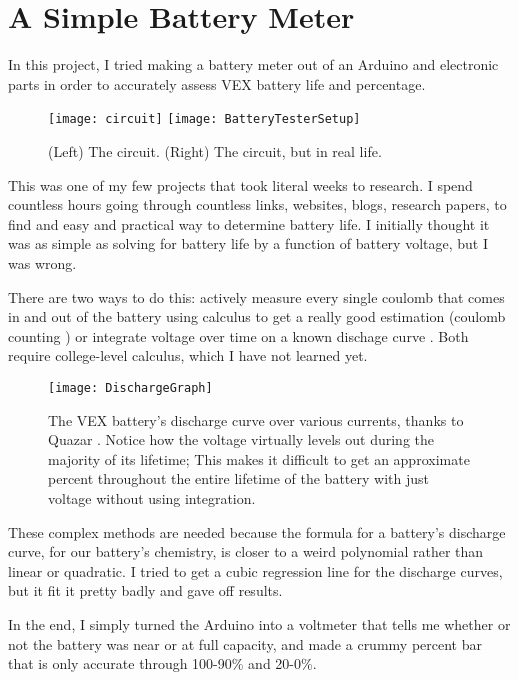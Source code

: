 \section{A Simple Battery Meter}
In this project, I tried making a battery meter out of an Arduino and electronic parts in order to accurately assess VEX battery life and percentage.

\begin{figure}[h]
    \centering
    \texttt{[image: circuit]}
    \texttt{[image: BatteryTesterSetup]}
    \caption{
        (Left) The circuit. (Right) The circuit, but in real life.
    }
\end{figure}

This was one of my few projects that took literal weeks to research. I spend countless hours going through countless links, websites, blogs, research papers, to find and easy and practical way to determine battery life. I initially thought it was as simple as solving for battery life by a function of battery voltage, but I was wrong.

There are two ways to do this: actively measure every single coulomb that comes in and out of the battery using calculus to get a really good estimation (coulomb counting \cite{CoulombCounting}) or integrate voltage over time on a known dischage curve \cite{IntegrationVoltage}. Both require college-level calculus, which I have not learned yet.

\begin{figure}[h]
    \centering
    \texttt{[image: DischargeGraph]}
    \caption{
        The VEX battery's discharge curve over various currents, thanks to Quazar \cite{Quazar}. Notice how the voltage virtually levels out during the majority of its lifetime; This makes it difficult to get an approximate percent throughout the entire lifetime of the battery with just voltage without using integration.
    }
\end{figure}

These complex methods are needed because the formula for a battery's discharge curve, for our battery's chemistry, is closer to a weird polynomial rather than linear or quadratic. I tried to get a cubic regression line for the discharge curves, but it fit it pretty badly and gave off results.

In the end, I simply turned the Arduino into a voltmeter that tells me whether or not the battery was near or at full capacity, and made a crummy percent bar that is only accurate through 100-90\% and 20-0\%.
